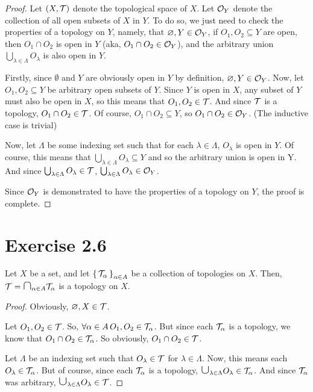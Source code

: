 \documentclass{article}
\begin{document}
\begin{proof}
    Let $(X, \mathcal{T})$ denote the topological space of $X$.
    Let $\mathcal{O}_Y$ denote the collection of all open subsets of $X$ in $Y$.
    To do so, we just need to check the properties of a topology on $Y$, namely, that
    $\varnothing, Y \in \mathcal{O}_Y$, if $O_1, O_2 \subseteq Y$ are open, then $O_1 \cap O_2$ is 
    open in $Y$ (aka, $O_1 \cap O_2 \in \mathcal{O}_Y$), and the arbitrary union $\bigcup_{\lambda \in \Lambda} O_\lambda$ is also open in $Y$.

    Firstly, since $\emptyset$ and $Y$ are obviously open in $Y$ by definition, $\varnothing, Y \in \mathcal{O}_Y$. Now, let $O_1, O_2 \subseteq Y$ be arbitrary open subsets of $Y$. Since $Y$ is open in $X$, any subset of $Y$ must also be open in $X$,
    so this means that $O_1, O_2 \in \mathcal{T}$. And since $\mathcal{T}$ is a topology, $O_1 \cap O_2 \in \mathcal{T}$. Of course, $O_1 \cap O_2 \subseteq Y$, so $O_1 \cap O_2 \in \mathcal{O}_Y$. (The inductive
    case is trivial)

    Now, let $\Lambda$ be some indexing set such that for each $\lambda \in \Lambda$,
    $O_{\lambda}$ is open in $Y$. Of course, this means that $\bigcup_{\lambda \in \Lambda} O_{\lambda} \subseteq Y$ and so the arbitrary union is open in Y. And since 
    $\bigcup_{\lambda \in \Lambda} O_{\lambda} \in \mathcal{T}$, $\bigcup_{\lambda \in \Lambda} O_{\lambda} \in \mathcal{O}_Y$. 

    Since $\mathcal{O}_Y$ is demonstrated to have the properties of a topology on $Y$, the proof
    is complete.
\end{proof}

\section{Exercise 2.6}

\begin{claim}
    Let $X$ be a set, and let $\set{\mathcal{T}_\alpha}_{\alpha \in A}$ be a collection of 
    topologies on $X$. Then, $\mc T = \medcap_{\alpha \in A} \mc T_\alpha$ is a topology on $X$.
\end{claim}

\begin{proof}
    Obviously, $\varnothing, X \in \mathcal{T}$.
    \newpara
    
    Let $O_1, O_2 \in \mathcal{T}$.
    So, $\forall \alpha \in A \, O_1, O_2 \in \mathcal{T}_\alpha$. But since each $\mathcal{T}_\alpha$ 
    is a topology, we know that $O_1 \cap O_2 \in \mathcal{T}_\alpha$. So obviously, $O_1 \cap O_2 \in \mathcal{T}$.
    \newpara

    Let $\Lambda$ be an indexing set such that $O_\lambda \in \mathcal{T}$ for $\lambda \in \Lambda$.
    Now, this means each $O_\lambda \in \mathcal{T}_\alpha$.
    But of course, since each $\mathcal{T}_\alpha$ is a topology, $\medcup_{\lambda \in \Lambda} O_\lambda \in \mc T_\alpha$. And since $\mathcal{T}_\alpha$ was arbitrary, $\medcup_{\lambda \in \Lambda} O_\lambda \in \mc T$.
\end{proof}
\end{document}

